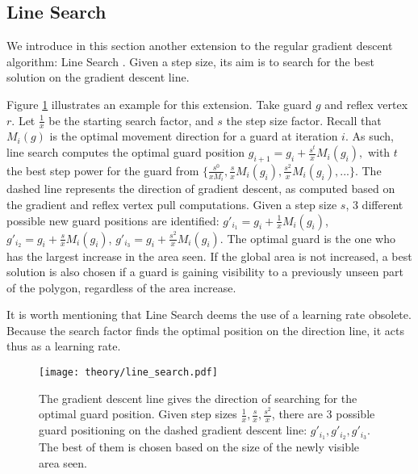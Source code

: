 \newpage
\subsection{Line Search}
\label{sec:line_search}
We introduce in this section another extension to the regular gradient descent algorithm: Line Search \cite{swann1969survey}. Given a step size, its aim is to search for the best solution on the gradient descent line. 

Figure \ref{fig:line} illustrates an example for this extension. Take guard $g$ and reflex vertex $r$. Let $\frac 1 x$ be the starting search factor, and $s$ the step size factor. Recall that $M_i(g)$ is the optimal movement direction for a guard at iteration $i$. As such, line search  computes the optimal guard position $g_{i + 1} = g_i + \frac{s^t}{x}M_i(g_i),$ with $t$ the best step power for the guard from $\{\frac{s^0}{xM_i}, \frac{s}{x}M_i(g_i), \frac{s^2}{x}M_i(g_i), ...\}$. The dashed line represents the direction of gradient descent, as computed based on the gradient and reflex vertex pull computations. Given a step size $s$, 3 different possible new guard positions are identified: $g'_{i_1} = g_i + \frac 1 xM_i(g_i)$,  $g'_{i_2} = g_i + \frac s x M_i(g_i)$, $g'_{i_3} = g_i + \frac{s^2}{x} M_i(g_i)$.
The optimal guard is the one who has the largest increase in the area seen. If the global area is not increased, a best solution is also chosen if a guard is gaining visibility to a previously unseen part of the polygon, regardless of the area increase.

It is worth mentioning that Line Search deems the use of a learning rate obsolete. Because the search factor finds the optimal position on the direction line, it acts thus as a learning rate.

\begin{figure}[h!]
    \centering
    \texttt{[image: theory/line\_search.pdf]}
    \caption{The gradient descent line gives the direction of searching for the optimal guard position. Given step sizes $\frac 1 x, \frac s x, \frac{s^2}{x}$, there are 3 possible guard positioning on the dashed gradient descent line: $g'_{i_1}, g'_{i_2}, g'_{i_3}$. The best of them is chosen based on the size of the newly visible area seen.}
    \label{fig:line}
\end{figure}


